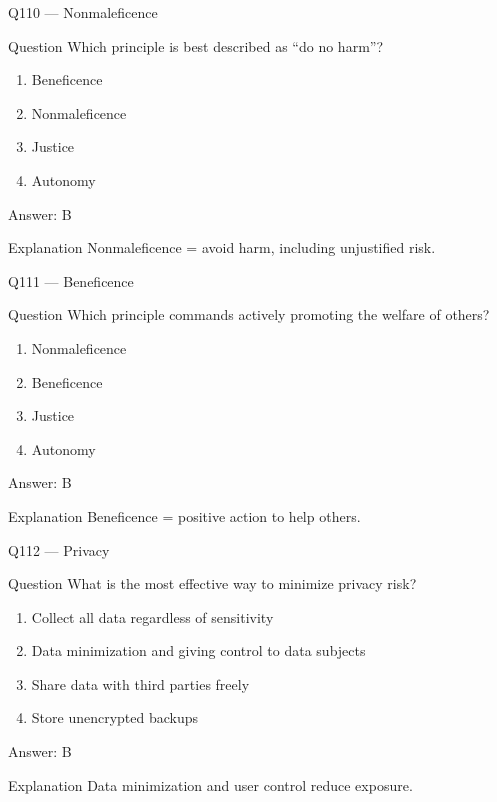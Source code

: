 \documentclass[aspectratio=169,8pt]{beamer}
\begin{document}
	\begin{frame}{Q110 --- Nonmaleficence}
		\begin{block}{Question}
			Which principle is best described as ``do no harm''?
		\end{block}
		\begin{enumerate}
			\item Beneficence
			\item Nonmaleficence
			\item Justice
			\item Autonomy
		\end{enumerate}
		\begin{exampleblock}{Answer: B}\end{exampleblock}
		\begin{block}{Explanation}
			Nonmaleficence = avoid harm, including unjustified risk.
		\end{block}
	\end{frame}
	
	\begin{frame}{Q111 --- Beneficence}
		\begin{block}{Question}
			Which principle commands actively promoting the welfare of others?
		\end{block}
		\begin{enumerate}
			\item Nonmaleficence
			\item Beneficence
			\item Justice
			\item Autonomy
		\end{enumerate}
		\begin{exampleblock}{Answer: B}\end{exampleblock}
		\begin{block}{Explanation}
			Beneficence = positive action to help others.
		\end{block}
	\end{frame}
	
	\begin{frame}{Q112 --- Privacy}
		\begin{block}{Question}
			What is the most effective way to minimize privacy risk?
		\end{block}
		\begin{enumerate}
			\item Collect all data regardless of sensitivity
			\item Data minimization and giving control to data subjects
			\item Share data with third parties freely
			\item Store unencrypted backups
		\end{enumerate}
		\begin{exampleblock}{Answer: B}\end{exampleblock}
		\begin{block}{Explanation}
			Data minimization and user control reduce exposure.
		\end{block}
	\end{frame}
	
\end{document}

